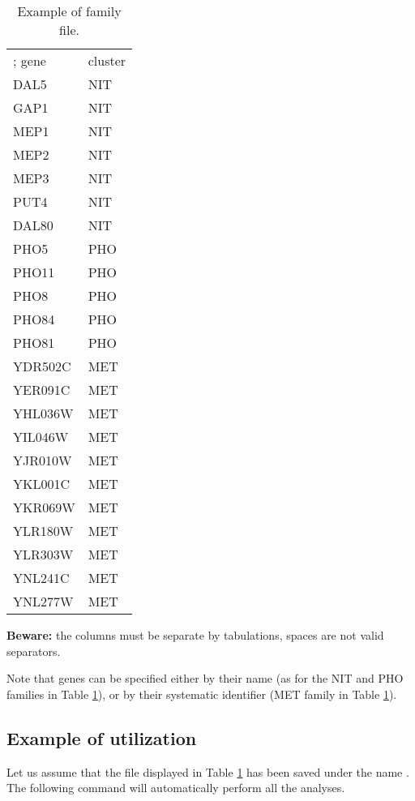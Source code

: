 \begin{table}
\begin{center}
\begin{tabular}{ll}
\hline
; gene & cluster \\
DAL5 & NIT \\
GAP1 & NIT \\
MEP1 & NIT \\
MEP2 & NIT \\
MEP3 & NIT \\
PUT4 & NIT \\
DAL80 & NIT \\
PHO5 & PHO \\
PHO11 & PHO \\
PHO8 & PHO \\
PHO84 & PHO \\
PHO81 & PHO \\
YDR502C & MET \\
YER091C & MET \\
YHL036W & MET \\
YIL046W & MET \\
YJR010W & MET \\
YKL001C & MET \\
YKR069W & MET \\
YLR180W & MET \\
YLR303W & MET \\
YNL241C & MET \\
YNL277W & MET \\
\hline
\end{tabular}
\end{center}
\caption{\label{table:cluster_file} Example of family file.}
\end{table}

\textbf{Beware:} the columns must be separate by tabulations, spaces
are not valid separators.

Note that genes can be specified either by their name (as for the NIT
and PHO families in Table \ref{table:cluster_file}), or by their
systematic identifier (MET family in Table \ref{table:cluster_file}).


\subsection{Example of utilization}

Let us assume that the file displayed in Table
\ref{table:cluster_file} has been saved under the name
. The following command will automatically perform all
the analyses.

